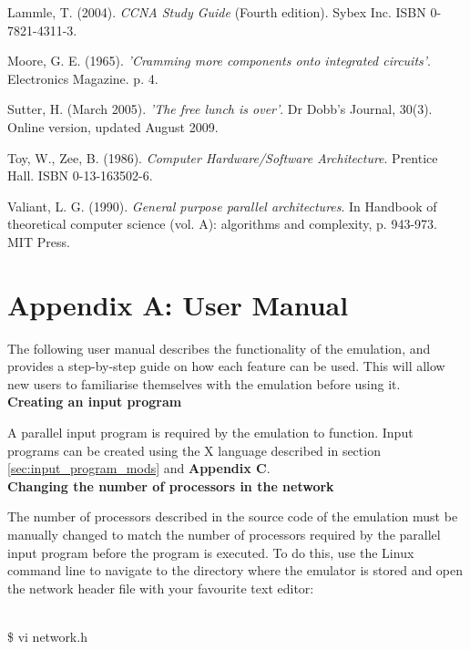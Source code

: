 \documentclass[a4paper, 12pt]{article}
\begin{document}
\begin{thebibliography}{30}
 Lammle, T. (2004). \textit{CCNA Study Guide} (Fourth edition). Sybex Inc. ISBN 0-7821-4311-3.

 Moore, G. E. (1965). \textit{'Cramming more components onto integrated circuits'}. Electronics Magazine. p. 4.

 Sutter, H. (March 2005). \textit{'The free lunch is over'}. Dr Dobb's Journal, 30(3). Online version, updated August 2009.

 Toy, W., Zee, B. (1986). \textit{Computer Hardware/Software Architecture}. Prentice Hall. ISBN 0-13-163502-6.

 Valiant, L. G. (1990). \textit{General purpose parallel architectures}. In Handbook of theoretical computer science (vol. A): algorithms and complexity, p. 943-973. MIT Press.

\end{thebibliography}

\newpage
\section*{Appendix A: User Manual}

The following user manual describes the functionality of the emulation, and provides a step-by-step guide on how each feature can be used. This will allow new users to familiarise themselves with the emulation before using it.\\

\noindent\textbf{Creating an input program}

\noindent A parallel input program is required by the emulation to function. Input programs can be created using the X language described in section \ref{sec:input_program_mods} and \textbf{Appendix C}.\\

\noindent\textbf{Changing the number of processors in the network}

\noindent The number of processors described in the source code of the emulation must be manually changed to match the number of processors required by the parallel input program before the program is executed. To do this, use the Linux command line to navigate to the directory where the emulator is stored and open the network header file with your favourite text editor:

{\\
\indent \$ vi network.h}
\end{document}
